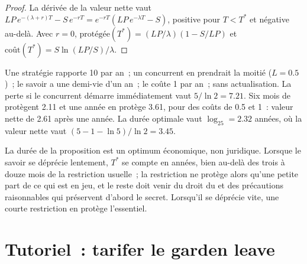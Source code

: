 \begin{proof}
La dérivée de la valeur nette vaut $LP\,e^{-(\lambda+r)T}-S\,e^{-rT}=e^{-rT}(LP\,e^{-\lambda T}-S)$, positive pour $T<T^*$ et négative au-delà. Avec
$r=0$, $\text{protégée}(T^*)=(LP/\lambda)(1-S/LP)$ et $\text{coût}(T^*)=S\ln(LP/S)/\lambda$.
\end{proof}

\begin{example}\label{ex:fm:intellectual-property-and-non-competes:hand}
Une stratégie rapporte 10 par an~; un concurrent en prendrait la moitié ($L=0.5$)~; le savoir a une demi-vie d'un an~; le  coûte 1 par an~; sans
actualisation. La perte si le concurrent démarre immédiatement vaut $5/\ln2=7.21$. Six mois de  protègent 2.11 et une année en protège 3.61, pour des coûts de
0.5 et 1~: valeur nette de 2.61 après une année. La durée optimale vaut $\log_25=2.32$ années, où la valeur nette vaut $(5-1-\ln5)/\ln2=3.45$.
\end{example}

\label{lst:fm:intellectual-property-and-non-competes:gl}

La durée de la proposition est un optimum économique, non juridique. Lorsque le savoir se déprécie lentement, $T^*$ se compte en années, bien au-delà des
trois à douze mois de la restriction usuelle~; la restriction ne protège alors qu'une petite part de ce qui est en jeu, et le reste doit venir du droit
du  et des précautions raisonnables qui préservent d'abord le secret. Lorsqu'il se déprécie vite, une courte restriction en protège l'essentiel.

\section{Tutoriel~: tarifer le garden leave}\label{tut:fm:intellectual-property-and-non-competes:tut}

